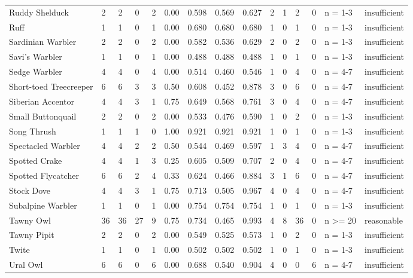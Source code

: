 \begin{landscape}
\begin{longtable}{L{3.6cm}*{12}{C{0.90cm}}L{1.45cm}L{1.65cm}}
Ruddy Shelduck & 2 & 2 & 0 & 2 & 0.00 & 0.598 & 0.569 & 0.627 & 2 & 1 & 2 & 0 & n = 1-3 & insufficient \\
Ruff & 1 & 1 & 0 & 1 & 0.00 & 0.680 & 0.680 & 0.680 & 1 & 0 & 1 & 0 & n = 1-3 & insufficient \\
Sardinian Warbler & 2 & 2 & 0 & 2 & 0.00 & 0.582 & 0.536 & 0.629 & 2 & 0 & 2 & 0 & n = 1-3 & insufficient \\
Savi's Warbler & 1 & 1 & 0 & 1 & 0.00 & 0.488 & 0.488 & 0.488 & 1 & 0 & 1 & 0 & n = 1-3 & insufficient \\
Sedge Warbler & 4 & 4 & 0 & 4 & 0.00 & 0.514 & 0.460 & 0.546 & 1 & 0 & 4 & 0 & n = 4-7 & insufficient \\
Short-toed Treecreeper & 6 & 6 & 3 & 3 & 0.50 & 0.608 & 0.452 & 0.878 & 3 & 0 & 6 & 0 & n = 4-7 & insufficient \\
Siberian Accentor & 4 & 4 & 3 & 1 & 0.75 & 0.649 & 0.568 & 0.761 & 3 & 0 & 4 & 0 & n = 4-7 & insufficient \\
Small Buttonquail & 2 & 2 & 0 & 2 & 0.00 & 0.533 & 0.476 & 0.590 & 1 & 0 & 2 & 0 & n = 1-3 & insufficient \\
Song Thrush & 1 & 1 & 1 & 0 & 1.00 & 0.921 & 0.921 & 0.921 & 1 & 0 & 1 & 0 & n = 1-3 & insufficient \\
Spectacled Warbler & 4 & 4 & 2 & 2 & 0.50 & 0.544 & 0.469 & 0.597 & 1 & 3 & 4 & 0 & n = 4-7 & insufficient \\
Spotted Crake & 4 & 4 & 1 & 3 & 0.25 & 0.605 & 0.509 & 0.707 & 2 & 0 & 4 & 0 & n = 4-7 & insufficient \\
Spotted Flycatcher & 6 & 6 & 2 & 4 & 0.33 & 0.624 & 0.466 & 0.884 & 3 & 1 & 6 & 0 & n = 4-7 & insufficient \\
Stock Dove & 4 & 4 & 3 & 1 & 0.75 & 0.713 & 0.505 & 0.967 & 4 & 0 & 4 & 0 & n = 4-7 & insufficient \\
Subalpine Warbler & 1 & 1 & 0 & 1 & 0.00 & 0.754 & 0.754 & 0.754 & 1 & 0 & 1 & 0 & n = 1-3 & insufficient \\
Tawny Owl & 36 & 36 & 27 & 9 & 0.75 & 0.734 & 0.465 & 0.993 & 4 & 8 & 36 & 0 & n >= 20 & reasonable \\
Tawny Pipit & 2 & 2 & 0 & 2 & 0.00 & 0.549 & 0.525 & 0.573 & 1 & 0 & 2 & 0 & n = 1-3 & insufficient \\
Twite & 1 & 1 & 0 & 1 & 0.00 & 0.502 & 0.502 & 0.502 & 1 & 0 & 1 & 0 & n = 1-3 & insufficient \\
Ural Owl & 6 & 6 & 0 & 6 & 0.00 & 0.688 & 0.540 & 0.904 & 4 & 0 & 0 & 6 & n = 4-7 & insufficient \\

\end{longtable}
\end{landscape}
